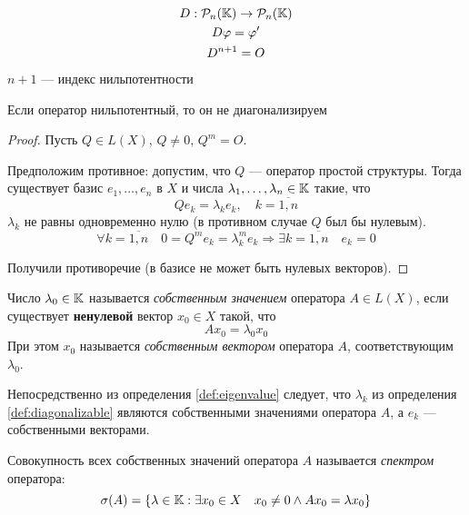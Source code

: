 \begin{example}
    \begin{gather*}
        D : \mathcal{P}_{n}({\mathbb{K}}) \to \mathcal{P}_{n}({\mathbb{K}}) \\
        D\varphi = \varphi' \\
        D^{n+1} = O 
    \end{gather*}
    $n+1$ — индекс нильпотентности
\end{example}

\begin{theorem}\label{th:nildiag}
    Если оператор нильпотентный, то он не диагонализируем
\end{theorem}

\begin{proof}
    Пусть $ Q \in L(X) $, $Q \neq 0$, $Q^m = O$.

    Предположим противное: допустим, что $Q$ — оператор простой структуры.
    Тогда существует базис $e_1, \dotsc, e_n$ в $X$ и числа $ \lambda_1, \dotsc,
    \lambda_n \in \mathbb{K} $ такие, что 
    \[ Q e_k = \lambda_k e_k, \quad k = \overline{1,n} \]
    $\lambda_k$ не равны одновременно нулю (в противном случае $Q$ был бы
    нулевым).
    \[ \forall k = \overline{1,n} \quad 0 = Q^m e_k = \lambda_k^m e_k \Rightarrow
    \exists k = \overline{1,n} \quad e_k = 0 \]

    Получили противоречие (в базисе не может быть нулевых векторов).
\end{proof}

\begin{definition}\label{def:eigenvalue}
    Число $\lambda_0 \in \mathbb{K}$ называется \emph{собственным значением}
    оператора $A \in L(X)$, если существует \textbf{ненулевой} вектор $x_0 \in
    X$ такой, что 
    \[ Ax_0 = \lambda_0 x_0 \]
    При этом $x_0$ называется \emph{собственным вектором} оператора $A$, соответствующим
    $\lambda_0$.
\end{definition}

Непосредственно из определения \ref{def:eigenvalue} следует, что
$\lambda_k$ из определения \ref{def:diagonalizable} являются собственными
значениями оператора $A$, а $e_k$ — собственными векторами.

\begin{definition}
    Совокупность всех собственных значений оператора $A$ называется
    \emph{спектром} оператора:
    \[ \operatorname{\sigma}(A) = \left\{\lambda \in \mathbb{K} : \exists x_0 \in X \quad x_0 \neq 0
    \wedge Ax_0 = \lambda x_0\right\} \]
\end{definition}

